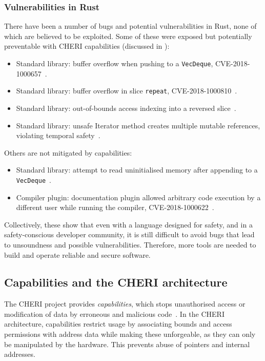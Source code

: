 \documentclass[dissertation.tex]{subfiles}
\begin{document}
\subsubsection{Vulnerabilities in Rust}
There have been a number of bugs and potential vulnerabilities in Rust,
none of which are believed to be exploited.
Some of these were exposed but potentially preventable with CHERI
capabilities (discussed in ):

\begin{itemize}
    \item Standard library: buffer overflow when pushing to a
    \texttt{VecDeque}, CVE-2018-1000657~\cite{cve-push,rust-issue-push}.
    \item Standard library: buffer overflow in slice \texttt{repeat},
    CVE-2018-1000810~\cite{cve-repeat,rust-advisory-repeat,rust-pr-slice}.
    \item Standard library: out-of-bounds access indexing into a
    reversed slice~\cite{rust-pr-reverse,rust-commit-reverse}.
    \item Standard library: unsafe Iterator method creates
    multiple mutable references, violating temporal
    safety~\cite{rust-issue-vec-mut}.
\end{itemize}

Others are not mitigated by capabilities:

\begin{itemize}
    \item Standard library: attempt to read uninitialised memory after
    appending to a \texttt{VecDeque}~\cite{rust-issue-deque-append}.
    \item Compiler plugin: documentation plugin allowed arbitrary code
    execution by a different user while running the
    compiler, CVE-2018-1000622~\cite{cve-rustdoc,rust-advisory-rustdoc}.
\end{itemize}

Collectively, these show that even with a language designed for safety,
and in a safety-conscious developer community, it is still difficult to
avoid bugs that lead to unsoundness and possible vulnerabilities.
Therefore, more tools are needed to build and operate reliable and
secure software.


\subsection{Capabilities and the CHERI architecture}
The CHERI project provides \emph{capabilities}, which stops unauthorised access or modification of data by erroneous and malicious code~\cite{cheri-v6}.
In the CHERI architecture, capabilities restrict usage by associating bounds and access permissions with address data while making these unforgeable, as they can only be manipulated by the hardware.
This prevents abuse of pointers and internal addresses.
\end{document}
